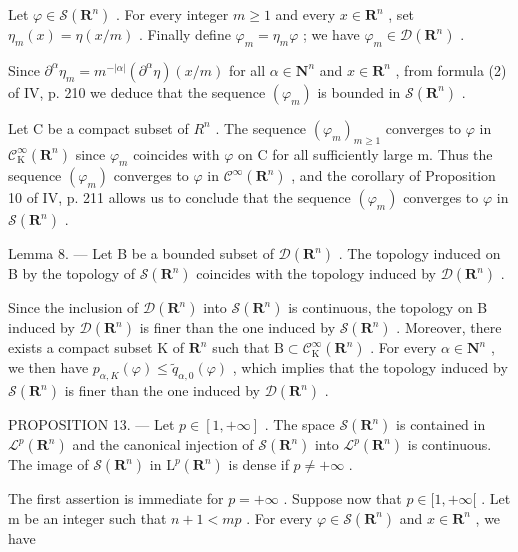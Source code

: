 Let \(\varphi \in \mathcal{S}(\mathbf{R}^n)\) . For every integer \(m \geqslant 1\) and every \(x \in \mathbf{R}^n\) , set \(\eta_m(x) = \eta(x/m)\) . Finally define \(\varphi_m = \eta_m\varphi\) ; we have \(\varphi_m \in \mathcal{D}(\mathbf{R}^n)\) .

Since \(\partial^{\alpha}\eta_{m} = m^{-|\alpha|}(\partial^{\alpha}\eta)(x / m)\) for all \(\alpha \in \mathbf{N}^{n}\) and \(x\in \mathbf{R}^n\) , from formula (2) of IV, p. 210 we deduce that the sequence \((\varphi_{m})\) is bounded in \(\mathcal{S}(\mathbf{R}^n)\) .

Let C be a compact subset of \(R^{n}\) . The sequence \((\varphi_{m})_{m\geqslant1}\) converges to \(\varphi\) in \(\mathcal{C}_{\mathrm{K}}^{\infty}(\mathbf{R}^{n})\) since \(\varphi_{m}\) coincides with \(\varphi\) on C for all sufficiently large m. Thus the sequence \((\varphi_{m})\) converges to \(\varphi\) in \(\mathcal{C}^{\infty}(\mathbf{R}^{n})\) , and the corollary of Proposition 10 of IV, p. 211 allows us to conclude that the sequence \((\varphi_{m})\) converges to \(\varphi\) in \(\mathcal{S}(\mathbf{R}^{n})\) .

Lemma 8. --- Let B be a bounded subset of \(\mathcal{D}(\mathbf{R}^{n})\) . The topology induced on B by the topology of \(\mathcal{S}(\mathbf{R}^{n})\) coincides with the topology induced by \(\mathcal{D}(\mathbf{R}^{n})\) .

Since the inclusion of \(\mathcal{D}(\mathbf{R}^{n})\) into \(\mathcal{S}(\mathbf{R}^{n})\) is continuous, the topology on B induced by \(\mathcal{D}(\mathbf{R}^{n})\) is finer than the one induced by \(\mathcal{S}(\mathbf{R}^{n})\) . Moreover, there exists a compact subset K of \(\mathbf{R}^{n}\) such that \(\mathrm{B} \subset \mathcal{C}_{\mathrm{K}}^{\infty}(\mathbf{R}^{n})\) . For every \(\alpha \in \mathbf{N}^{n}\) , we then have \(p_{\alpha,K}(\varphi) \leqslant \widetilde{q}_{\alpha,0}(\varphi)\) , which implies that the topology induced by \(\mathcal{S}(\mathbf{R}^{n})\) is finer than the one induced by \(\mathcal{D}(\mathbf{R}^{n})\) .

PROPOSITION 13. --- Let \(p \in [1, +\infty]\) . The space \(\mathcal{S}(\mathbf{R}^{n})\) is contained in \(\mathcal{L}^{p}(\mathbf{R}^{n})\) and the canonical injection of \(\mathcal{S}(\mathbf{R}^{n})\) into \(\mathcal{L}^{p}(\mathbf{R}^{n})\) is continuous. The image of \(\mathcal{S}(\mathbf{R}^{n})\) in \(\mathrm{L}^{p}(\mathbf{R}^{n})\) is dense if \(p \neq +\infty\) .

The first assertion is immediate for \(p = +\infty\) . Suppose now that \(p \in [1, +\infty[\) . Let m be an integer such that \(n + 1 < mp\) . For every \(\varphi \in \mathcal{S}(\mathbf{R}^{n})\) and \(x \in \mathbf{R}^{n}\) , we have


